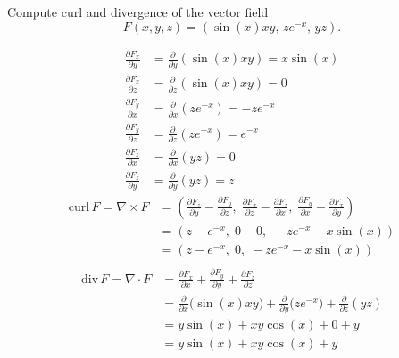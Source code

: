 \begin{exercise}
	Compute curl and divergence of the vector field
	$$
		F(x,y,z) = (\sin(x)xy, \, ze^{-x}, \, yz).
	$$
\end{exercise}

\begin{solution}
	$$
		\begin{aligned}
			\frac{\partial F_x}{\partial y} & = \frac{\partial}{\partial y} (\sin(x) xy) = x \sin(x) \\
			\frac{\partial F_x}{\partial z} & = \frac{\partial}{\partial z} (\sin(x) xy) = 0         \\
			\frac{\partial F_y}{\partial x} & = \frac{\partial}{\partial x} (ze^{-x}) = -ze^{-x}     \\
			\frac{\partial F_y}{\partial z} & = \frac{\partial}{\partial z} (ze^{-x}) = e^{-x}       \\
			\frac{\partial F_z}{\partial x} & = \frac{\partial}{\partial x} (yz)  = 0                \\
			\frac{\partial F_z}{\partial y} & = \frac{\partial}{\partial y} (yz)  = z
		\end{aligned}
	$$
	$$
		\begin{aligned}
			\text{curl}\, F = \nabla \times F & = \left(
			\frac{\partial F_z}{\partial y} - \frac{\partial F_y}{\partial z},\;
			\frac{\partial F_x}{\partial z} - \frac{\partial F_z}{\partial x},\;
			\frac{\partial F_y}{\partial x} - \frac{\partial F_x}{\partial y}
			\right)                                                                                         \\
			                                  & = \left( z - e^{-x},\; 0 - 0,\; -ze^{-x} - x\sin(x) \right) \\
			                                  & = \left( z - e^{-x},\; 0,\; -ze^{-x} - x\sin(x) \right)     \\[1em]
		\end{aligned}
	$$
	$$
		\begin{aligned}
			\text{div}\, F = \nabla \cdot F & = \frac{\partial F_x}{\partial x} + \frac{\partial F_y}{\partial y} + \frac{\partial F_z}{\partial z}                             \\
			                                & = \frac{\partial}{\partial x}\big(\sin(x)xy\big) + \frac{\partial}{\partial y}\big(ze^{-x}\big) + \frac{\partial}{\partial z}(yz) \\
			                                & = y\sin(x) + xy\cos(x) + 0 + y                                                                                                    \\
			                                & = y\sin(x) + xy\cos(x) + y
		\end{aligned}
	$$
\end{solution}
